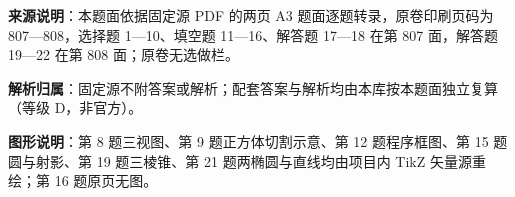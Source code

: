 
\begin{gknotice}
\textbf{来源说明}：本题面依据固定源 PDF 的两页 A3 题面逐题转录，原卷印刷页码为 807—808，选择题 1—10、填空题 11—16、解答题 17—18 在第 807 面，解答题 19—22 在第 808 面；原卷无选做栏。

\textbf{解析归属}：固定源不附答案或解析；配套答案与解析均由本库按本题面独立复算（等级 D，非官方）。

\textbf{图形说明}：第 8 题三视图、第 9 题正方体切割示意、第 12 题程序框图、第 15 题圆与射影、第 19 题三棱锥、第 21 题两椭圆与直线均由项目内 TikZ 矢量源重绘；第 16 题原页无图。
\end{gknotice}


